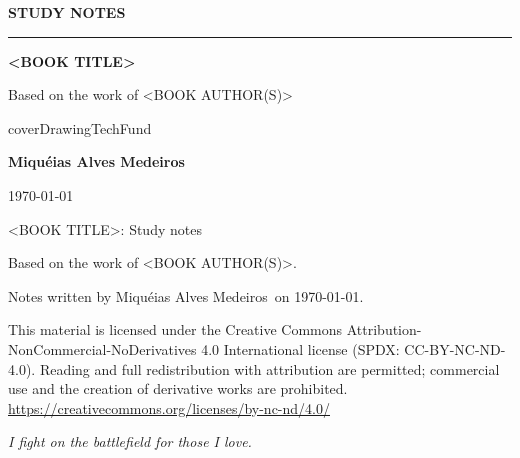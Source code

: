 \documentclass[12pt,a4paper]{article}
\newcommand{\coverserif}{\rmfamily}
\newcommand{\bookTitle}{<BOOK TITLE>}
\newcommand{\bookAuthor}{<BOOK AUTHOR(S)>}
\newcommand{\studentName}{Miquéias Alves Medeiros}
\newcommand{\coverArea}{TechFund}
\newcommand{\documentLicense}{This material is licensed under the Creative Commons Attribution-NonCommercial-NoDerivatives 4.0 International license (SPDX: CC-BY-NC-ND-4.0). Reading and full redistribution with attribution are permitted; commercial use and the creation of derivative works are prohibited. \url{https://creativecommons.org/licenses/by-nc-nd/4.0/}}
\newcommand{\coverDrawing}{\csname coverDrawing\coverArea\endcsname}
\begin{document}
\begin{titlepage}
	\thispagestyle{empty}
	\centering
	\coverserif
	\vspace*{1.5cm}

	{\small\bfseries\color{coverdim}\MakeUppercase{Study notes}\par}
	\vspace{0.4cm}
	{\color{coverfg}\rule{2cm}{0.6pt}\par}
	\vspace{1.0cm}

	{\bfseries\fontsize{24}{30}\selectfont\color{coverfg} \bookTitle\par}
	\vspace{0.8cm}
	{\normalsize\color{coverdim} Based on the work of \bookAuthor\par}

	\vfill

	\coverDrawing

	\vfill

	{\large\bfseries\color{coverfg} \studentName\par}
	\vspace{0.3cm}
	{\small\color{coverdim} \today\par}
	\vspace*{1cm}
\end{titlepage}

\thispagestyle{empty}
\vspace*{\fill}
\begin{flushleft}
	\footnotesize
	\bookTitle: Study notes\par
	\smallskip
	Based on the work of \bookAuthor.
	\par
	\smallskip
	Notes written by \studentName\ on \today.
	\par
	\smallskip
	\documentLicense
\end{flushleft}
\newpage

\thispagestyle{empty}
\vspace*{\fill}
\begin{flushright}
	\itshape I fight on the battlefield for those I love.
\end{flushright}
\vspace*{\fill}
\newpage
\end{document}
